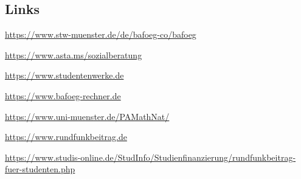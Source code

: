 \begin{multicols}{2}
\subsection{Links}
\begin{flushleft}
	\footnotesize
	\begin{fibelurl}
		\label{geld:bmbf}
	\end{fibelurl}
	\begin{fibelurl}
		\url{https://www.stw-muenster.de/de/bafoeg-co/bafoeg}
		\label{geld:studierendenwerk-ms}
	\end{fibelurl}
	\begin{fibelurl}
		\url{https://www.asta.ms/sozialberatung}
		\label{geld:asta_sozialberatung}
	\end{fibelurl}
	\begin{fibelurl}
		\url{https://www.studentenwerke.de}
		\label{geld:studentenwerke}
	\end{fibelurl}
	\begin{fibelurl}
		\url{https://www.bafoeg-rechner.de}
		\label{geld:bafoeg-rechner}
	\end{fibelurl}
	\begin{fibelurl}
		\url{https://www.uni-muenster.de/PAMathNat/}
		\label{geld:pa_physik}
	\end{fibelurl}
	\begin{fibelurl}
		\url{https://www.rundfunkbeitrag.de}
		\label{geld:rundfunkbeitrag}
	\end{fibelurl}
	\begin{fibelurl}
		\url{https://www.studis-online.de/StudInfo/Studienfinanzierung/rundfunkbeitrag-fuer-studenten.php}
		\label{geld:rundfunkbeitrag_studenten}
	\end{fibelurl}
\end{flushleft}

\end{multicols}

